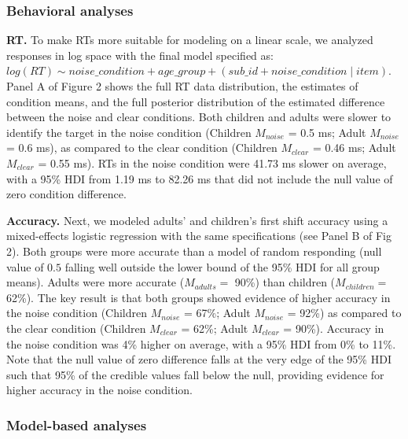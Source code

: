 \documentclass[10pt, letterpaper]{article}
\begin{document}
\subsubsection{Behavioral analyses}\label{behavioral-analyses}

\textbf{RT.} To make RTs more suitable for modeling on a linear scale,
we analyzed responses in log space with the final model specified as:
\texttt{$log(RT) \sim noise\_condition + age\_group + (sub\_id + noise\_condition \mid item)$}.
Panel A of Figure 2 shows the full RT data distribution, the estimates
of condition means, and the full posterior distribution of the estimated
difference between the noise and clear conditions. Both children and
adults were slower to identify the target in the noise condition
(Children \(M_{noise}\) = 0.5 ms; Adult \(M_{noise}\) = 0.6 ms), as
compared to the clear condition (Children \(M_{clear}\) = 0.46 ms; Adult
\(M_{clear}\) = 0.55 ms). RTs in the noise condition were 41.73 ms
slower on average, with a 95\% HDI from 1.19 ms to 82.26 ms that did not
include the null value of zero condition difference.

\textbf{Accuracy.} Next, we modeled adults' and children's first shift
accuracy using a mixed-effects logistic regression with the same
specifications (see Panel B of Fig 2). Both groups were more accurate
than a model of random responding (null value of \(0.5\) falling well
outside the lower bound of the 95\% HDI for all group means). Adults
were more accurate (\(M_{adults} =\) 90\%) than children
(\(M_{children} =\) 62\%). The key result is that both groups showed
evidence of higher accuracy in the noise condition (Children
\(M_{noise}\) = 67\%; Adult \(M_{noise}\) = 92\%) as compared to the
clear condition (Children \(M_{clear}\) = 62\%; Adult \(M_{clear}\) =
90\%). Accuracy in the noise condition was 4\% higher on average, with a
95\% HDI from 0\% to 11\%. Note that the null value of zero difference
falls at the very edge of the 95\% HDI such that 95\% of the credible
values fall below the null, providing evidence for higher accuracy in
the noise condition.

\subsubsection{Model-based analyses}\label{model-based-analyses}
\end{document}

